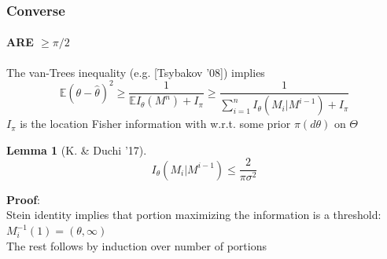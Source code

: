 \documentclass[mathserif]{beamer}
\newcommand{\sgn}{\mathsf{sign}}
\newtheorem{lem}{Lemma}
\begin{document}
\begin{frame}
\frametitle{Converse}
\framesubtitle{ARE $\geq \pi/2$}
The van-Trees inequality (e.g. [Tsybakov '08]) implies
\[
\mathbb E \left(\theta - \widehat{\theta} \right)^2 \geq \frac{1}{\mathbb E I_\theta(M^n) + I_\pi} \geq \frac{1}{\sum_{i=1}^n I_\theta(M_i|M^{i-1}) + I_\pi} 
\]
$I_\pi$ is the location Fisher information with w.r.t. some prior $\pi(d\theta)$ on $\Theta$\\

\begin{lem}[K. \& Duchi '17]
\[
I_\theta(M_i|M^{i-1}) \leq \frac{2}{\pi\sigma^2}
\]
\end{lem}
\textbf{Proof}: \\
Stein identity implies that portion maximizing the information is a threshold: $M_i^{-1}(1) = (\theta,\infty)$  \\
The rest follows by induction over number of portions
\end{frame}

%
\end{document}
